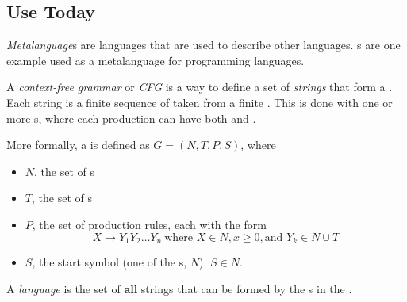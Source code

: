 \subsection{Use Today}\label{subsec:Use_Today}
\begin{definition}[Metalanguage]\label{def:Metalanguage}
  \emph{Metalanguage}s are languages that are used to describe other languages.
  s are one example used as a metalanguage for programming languages.
\end{definition}

\begin{definition}\label{def:Context_Free_Grammar}
  A \emph{context-free grammar} or \emph{CFG} is a way to define a set of \textit{strings} that form a .
  Each string is a finite sequence of  taken from a finite .
  This is done with one or more s, where each production can have both  and .

  More formally, a  is defined as $G = (N, T, P, S)$, where
  \begin{itemize}[noitemsep]
  \item $N$, the set of s
  \item $T$, the set of s
  \item $P$, the set of production rules, each with the form
    \begin{equation*}
      X \rightarrow Y_{1} Y_{2} \ldots Y_{n} \: \text{where } X \in N, x \geq 0, \text{and } Y_{k} \in N \cup T
    \end{equation*}
  \item $S$, the start symbol (one of the s, $N$). $S \in N$.
  \end{itemize}
\end{definition}

\begin{definition}[Language]\label{def:Language}
  A \emph{language} is the set of \textbf{\textup{all}} strings that can be formed by the s in the .
\end{definition}

